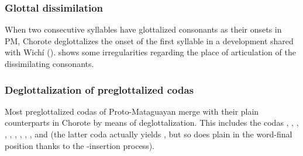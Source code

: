 \subsubsection{Glottal dissimilation}\label{ch-glot-dissim}

When two consecutive syllables have glottalized consonants as their onsets in PM, Chorote deglottalizes the onset of the first syllable in a development shared with Wichí ().  shows some irregularities regarding the place of articulation of the dissimilating consonants.

\begin{exe}
    \ex \monkparakeet
    \ex \hornero \label{ch-degl-hornero}
    \ex \saliva
    \ex \hiccup
\end{exe}
    
\subsubsection{Deglottalization of preglottalized codas}\label{ch-preglottalized}

Most preglottalized codas of Proto-Mataguayan merge with their plain counterparts in Chorote by means of deglottalization. This includes the codas , , , , , , , , , and  (the latter coda actually yields , but so does plain  in the word-final position thanks to the \mbox{-}insertion process).

\begin{exe}
    \ex \honeycomb
    \ex \drinkn
    \ex \son
    \ex \yicaay
    \ex \cutdown
    \ex \fieldn
    \ex \notafraid
    \ex \hidev
    \ex \fart
    \ex \dew
    \ex \wax
    \ex \water
    \ex \tail
    \ex \hole
    \ex \sunn
    \ex \answer
    \ex \oldn
    \ex \wash
    \ex \winter
    \ex \languageword
    \ex \thread
    \ex \yicalhuk
    \ex \powder
    \ex \nose
    \ex \smelln
    \ex \lippaset
    \ex \fence
    \ex \lid
    \ex \starn
    \ex \vein
    \ex \sprout
    \ex \abdcavity
    \ex \suckb
    \ex \shoot
    \ex \spinsew
    \ex \carrysh
    \ex \dig
    \ex \blind
    \ex \uncle
    \ex \duraznillo
    \ex \nest
    \ex \badmood
    \ex \burrow
    \ex \walk
    \ex \climb
    \ex \night
    \ex \headn
    \ex \earth
    \ex \palosanto
    \ex \sandyplace
    \ex \firewoodhuk
    \ex \knee
    \ex \jaguar
    \ex \snakeatuj
    \ex \chest
\end{exe}

